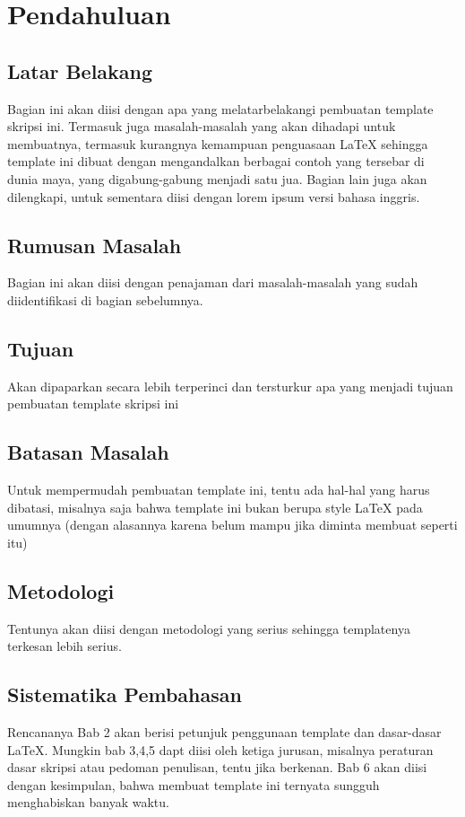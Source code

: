 \chapter{Pendahuluan}
\label{chap:intro}
   
\section{Latar Belakang}
\label{sec:label}

Bagian ini akan diisi dengan apa yang melatarbelakangi pembuatan template skripsi ini.
Termasuk juga masalah-masalah yang akan dihadapi untuk membuatnya, termasuk kurangnya kemampuan penguasaan \LaTeX{} sehingga template ini dibuat dengan mengandalkan berbagai contoh yang tersebar di dunia maya, yang digabung-gabung menjadi satu jua.
Bagian lain juga akan dilengkapi, untuk sementara diisi dengan lorem ipsum versi bahasa inggris.


\section{Rumusan Masalah}
\label{sec:rumusan}
Bagian ini akan diisi dengan penajaman dari masalah-masalah yang sudah diidentifikasi di bagian sebelumnya. 


\section{Tujuan}
\label{sec:tujuan}
Akan dipaparkan secara lebih terperinci dan tersturkur apa yang menjadi tujuan pembuatan template skripsi ini



\section{Batasan Masalah}
\label{sec:batasan}
Untuk mempermudah pembuatan template ini, tentu ada hal-hal yang harus dibatasi, misalnya saja bahwa template ini bukan berupa style \LaTeX{} pada umumnya (dengan alasannya karena belum mampu jika diminta membuat seperti itu)



\section{Metodologi}
\label{sec:metlit}
Tentunya akan diisi dengan metodologi yang serius sehingga templatenya terkesan lebih serius.



\section{Sistematika Pembahasan}
\label{sec:sispem}
Rencananya Bab 2 akan berisi petunjuk penggunaan template dan dasar-dasar \LaTeX.
Mungkin bab 3,4,5 dapt diisi oleh ketiga jurusan, misalnya peraturan dasar skripsi atau pedoman penulisan, tentu jika berkenan.
Bab 6 akan diisi dengan kesimpulan, bahwa membuat template ini ternyata sungguh menghabiskan banyak waktu.

